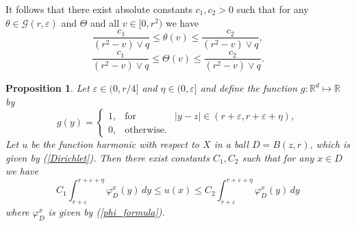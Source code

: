 \documentclass[a4paper,12pt,reqno]{amsart}
\newtheorem{proposition}[theorem]{Proposition}
\theoremstyle{definition}
\theoremstyle{remark}
\newcommand{\eps}{\varepsilon}
\newcommand{\calG}{\mathcal{G}}
\newcommand{\R}{\mathds{R}}
\newcommand{\Rd}{\mathds{R}^d}
\begin{document}
It follows that there exist absolute constants $c_1, c_2 > 0$ such that for any $\theta \in \calG(r,\eps)$ and $\Theta$  and all $v \in [0,r^2)$ we have
\begin{equation}
\label{theta_estimate}
\frac{c_1}{(r^2 - v) \vee q} \le \theta(v) \le \frac{c_2}{(r^2 - v) \vee q},
\end{equation}
\begin{equation}
\label{Theta_estimate}
\frac{c_1}{(r^2 - v) \vee q} \le \Theta(v) \le \frac{c_2}{(r^2 - v) \vee q}.
\end{equation}

\begin{proposition}
\label{main_thm_for_small_rings}
Let $\eps \in (0,r/4]$ and $\eta \in (0,\eps]$ and define the function $g:\Rd\mapsto \R$ by 
\begin{equation}
\label{g_definition}
g(y)= \left\{              
\begin{array}{lll}                   
1,&\text{for}& |y - z| \in (r+\eps,r+\eps+\eta), \\  
0, &\text{otherwise.}&
\end{array}       
\right. 
\end{equation}
Let $u$ be the function harmonic with respect to $X$ in a ball $D = B(z,r)$, which is given by (\ref{Dirichlet}). Then there exist constants $C_1, C_2$ such that for any $x \in D$ we have
\begin{equation}
\label{harmonic_measure_for_small_rings}
C_1 \int_{r+\eps}^{r+\eps+\eta} \varphi_D^x(y) \, dy \le u(x) \le C_2 \int_{r+\eps}^{r+\eps+\eta} \varphi_D^x(y) \, dy
\end{equation}
where $\varphi_D^x$ is given by (\ref{phi_formula}).
\end{proposition}
\end{document}
